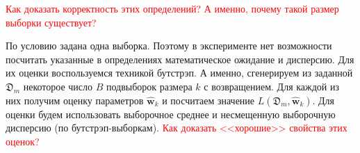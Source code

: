 \textcolor{red}{Как доказать корректность этих определений? А именно, почему такой размер выборки существует?}

По условию задана одна выборка. Поэтому в эксперименте нет возможности посчитать указанные в определениях математическое ожидание и дисперсию. Для их оценки воспользуемся техникой бутстрэп. А именно, сгенерируем из заданной $\mathfrak{D}_m$ некоторое число $B$ подвыборок размера $k$ с возвращением. Для каждой из них получим оценку параметров $\hat{\mathbf{w}}_{k}$ и посчитаем значение $L(\mathfrak{D}_m, \hat{\mathbf{w}}_{k})$. Для оценки будем использовать выборочное среднее и несмещенную выборочную дисперсию (по бутстрэп-выборкам). \textcolor{red}{Как доказать <<хорошие>> свойства этих оценок?}